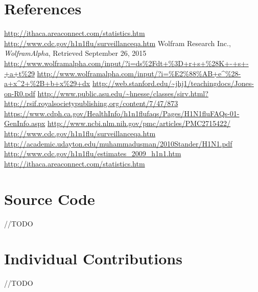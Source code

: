 \documentclass[titlepage]{article}
\begin{document}
\section{References}
	\begin{thebibliography}{9}
		\url{http://ithaca.areaconnect.com/statistics.htm}
		\url{http://www.cdc.gov/h1n1flu/surveillanceqa.htm}
		Wolfram Research Inc.,
		\emph{WolframAlpha},
		Retrieved September 26, 2015
		\url{http://www.wolframalpha.com/input/?i=ds%2Fdt+%3D+r+s+%28K+-+s+-+a+t%29}
		\url{http://www.wolframalpha.com/input/?i=%E2%88%AB+e^%28-a+x^2+%2B+b+x%29+dx}
		\url{http://web.stanford.edu/~jhj1/teachingdocs/Jones-on-R0.pdf}
		\url{http://www.public.asu.edu/~hnesse/classes/sirv.html?}
		\url{http://rsif.royalsocietypublishing.org/content/7/47/873}
		\url{https://www.cdph.ca.gov/HealthInfo/h1n1flufaqs/Pages/H1N1fluFAQs-01-GenInfo.aspx}
		\url{http://www.ncbi.nlm.nih.gov/pmc/articles/PMC2715422/}
		\url{http://www.cdc.gov/h1n1flu/surveillanceqa.htm}
        \url{http://academic.udayton.edu/muhammadusman/2010Stander/H1N1.pdf}
        \url{http://www.cdc.gov/h1n1flu/estimates_2009_h1n1.htm}
        \url{http://ithaca.areaconnect.com/statistics.htm}
	\end{thebibliography}

\section{Source Code}
	//TODO
\section{Individual Contributions}
	//TODO
\end{document}
